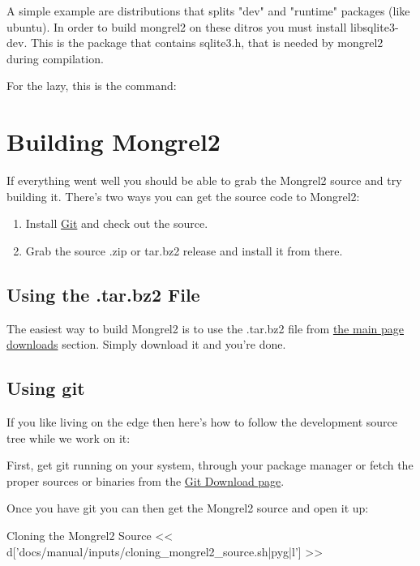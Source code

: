 A simple example are distributions that splits "dev" and "runtime" 
packages (like ubuntu). In order to build mongrel2 on these
ditros you must install libsqlite3-dev. This is the package that contains
sqlite3.h, that is needed by mongrel2 during compilation.

For the lazy, this is the command: 

\section{Building Mongrel2}

If everything went well you should be able to grab the Mongrel2 source
and try building it.  There's two ways you can get the source code to
Mongrel2:

\begin{enumerate}
\item Install \href{http://git-scm.org}{Git} and check out the source.
\item Grab the source .zip or tar.bz2 release and install it from there.
\end{enumerate}

\subsection{Using the .tar.bz2 File}

The easiest way to build Mongrel2 is to use the .tar.bz2 file from 
\href{http://mongrel2.org/home#download}{the main page downloads} section.
Simply download it and you're done.


\subsection{Using git}

If you like living on the edge then here's how to follow the development source
tree while we work on it:

First, get git running on your system, through your package manager or fetch
the proper sources or binaries from the \href{http://git-scm.com/download}{Git Download page}.

Once you have git you can then get the Mongrel2 source and open it up:

\begin{code}{Cloning the Mongrel2 Source}
<< d['docs/manual/inputs/cloning_mongrel2_source.sh|pyg|l'] >>
\end{code}

